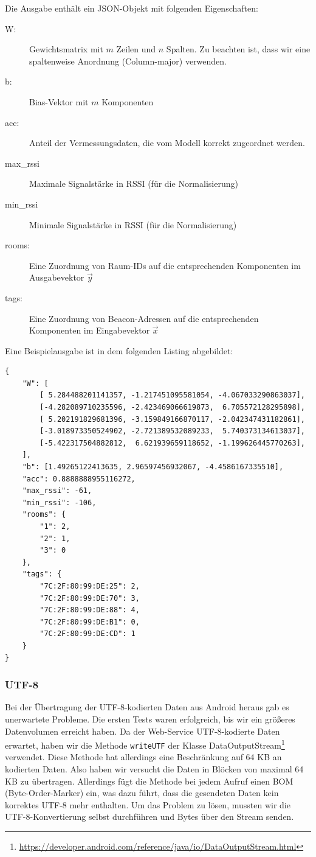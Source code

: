 Die Ausgabe enthält ein JSON-Objekt mit folgenden Eigenschaften:
\begin{description}
	\item[W:] Gewichtsmatrix mit $m$ Zeilen und $n$ Spalten. Zu beachten ist, dass wir eine
		spaltenweise Anordnung (Column-major) verwenden.
	\item[b:] Bias-Vektor mit $m$ Komponenten
	\item[acc:] Anteil der Vermessungsdaten, die vom Modell korrekt zugeordnet werden.
	\item[max\_rssi] Maximale Signalstärke in RSSI (für die Normalisierung)
	\item[min\_rssi] Minimale Signalstärke in RSSI (für die Normalisierung)
	\item[rooms:] Eine Zuordnung von Raum-IDs auf die entsprechenden Komponenten im
		Ausgabevektor $\vec{y}$
	\item[tags:] Eine Zuordnung von Beacon-Adressen auf die entsprechenden Komponenten
		im Eingabevektor $\vec{x}$
\end{description}

Eine Beispielausgabe ist in dem folgenden Listing abgebildet:
\begin{lstlisting}
{
	"W": [
		[ 5.284488201141357, -1.217451095581054, -4.067033290863037],
		[-4.282089710235596, -2.423469066619873,  6.705572128295898],
		[ 5.202191829681396, -3.159849166870117, -2.042347431182861],
		[-3.018973350524902, -2.721389532089233,  5.740373134613037],
		[-5.422317504882812,  6.621939659118652, -1.199626445770263],
	],
	"b": [1.49265122413635, 2.96597456932067, -4.4586167335510],
	"acc": 0.8888888955116272,
	"max_rssi": -61,
	"min_rssi": -106,
	"rooms": {
		"1": 2,
		"2": 1,
		"3": 0
	},
	"tags": {
		"7C:2F:80:99:DE:25": 2,
		"7C:2F:80:99:DE:70": 3,
		"7C:2F:80:99:DE:88": 4,
		"7C:2F:80:99:DE:B1": 0,
		"7C:2F:80:99:DE:CD": 1
	}
}
\end{lstlisting}

\subsubsection{UTF-8}
Bei der Übertragung der UTF-8-kodierten Daten aus Android heraus gab es unerwartete Probleme.
Die ersten Tests waren erfolgreich, bis wir ein größeres Datenvolumen erreicht haben.
Da der Web-Service UTF-8-kodierte Daten erwartet, haben wir die Methode \texttt{writeUTF}
der Klasse DataOutputStream\footnote{\url{https://developer.android.com/reference/java/io/DataOutputStream.html}} 
verwendet. Diese Methode hat allerdings eine Beschränkung auf 64 KB an kodierten Daten.
Also haben wir versucht die Daten in Blöcken von maximal 64 KB zu übertragen. Allerdings
fügt die Methode bei jedem Aufruf einen BOM (Byte-Order-Marker) ein, was dazu führt,
dass die gesendeten Daten kein korrektes UTF-8 mehr enthalten.
Um das Problem zu lösen, mussten wir die UTF-8-Konvertierung selbst durchführen
und Bytes über den Stream senden.

